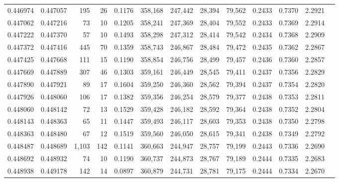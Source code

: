\begin{tabular}{rrrrrrrrrrrrr}
0.446974 & 0.447057 &   195 &  26 &                                     0.1176 & 358,168 & 247,442 &  28,394 &  79,562 & 0.2433 & 0.7370 & 2.2921 \\
0.447062 & 0.447216 &    73 &  10 &                                     0.1205 & 358,241 & 247,369 &  28,404 &  79,552 & 0.2433 & 0.7369 & 2.2914 \\
0.447222 & 0.447370 &    57 &  10 &                                     0.1493 & 358,298 & 247,312 &  28,414 &  79,542 & 0.2434 & 0.7368 & 2.2909 \\
0.447372 & 0.447416 &   445 &  70 &                                     0.1359 & 358,743 & 246,867 &  28,484 &  79,472 & 0.2435 & 0.7362 & 2.2867 \\
0.447425 & 0.447668 &   111 &  15 &                                     0.1190 & 358,854 & 246,756 &  28,499 &  79,457 & 0.2436 & 0.7360 & 2.2857 \\
0.447669 & 0.447889 &   307 &  46 &                                     0.1303 & 359,161 & 246,449 &  28,545 &  79,411 & 0.2437 & 0.7356 & 2.2829 \\
0.447890 & 0.447921 &    89 &  17 &                                     0.1604 & 359,250 & 246,360 &  28,562 &  79,394 & 0.2437 & 0.7354 & 2.2820 \\
0.447926 & 0.448060 &   106 &  17 &                                     0.1382 & 359,356 & 246,254 &  28,579 &  79,377 & 0.2438 & 0.7353 & 2.2811 \\
0.448060 & 0.448142 &    72 &  13 &                                     0.1529 & 359,428 & 246,182 &  28,592 &  79,364 & 0.2438 & 0.7352 & 2.2804 \\
0.448143 & 0.448363 &    65 &  11 &                                     0.1447 & 359,493 & 246,117 &  28,603 &  79,353 & 0.2438 & 0.7350 & 2.2798 \\
0.448363 & 0.448480 &    67 &  12 &                                     0.1519 & 359,560 & 246,050 &  28,615 &  79,341 & 0.2438 & 0.7349 & 2.2792 \\
0.448487 & 0.448689 & 1,103 & 142 &                                     0.1141 & 360,663 & 244,947 &  28,757 &  79,199 & 0.2443 & 0.7336 & 2.2690 \\
0.448692 & 0.448932 &    74 &  10 &                                     0.1190 & 360,737 & 244,873 &  28,767 &  79,189 & 0.2444 & 0.7335 & 2.2683 \\
0.448938 & 0.449178 &   142 &  14 &                                     0.0897 & 360,879 & 244,731 &  28,781 &  79,175 & 0.2444 & 0.7334 & 2.2670 \\

\end{tabular}
